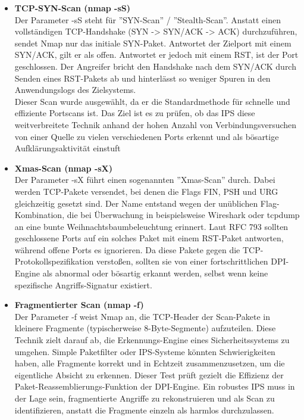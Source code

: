 \begin{itemize}
	\item \textbf{TCP-SYN-Scan (nmap -sS)}\\
	Der Parameter -sS steht für ''SYN-Scan'' / ''Stealth-Scan''. Anstatt einen vollständigen TCP-Handshake (SYN -> SYN/ACK -> ACK) durchzuführen, sendet Nmap nur das initiale SYN-Paket. Antwortet der Zielport mit einem SYN/ACK, gilt er als offen. Antwortet er jedoch mit einem RST, ist der Port geschlossen. Der Angreifer bricht den Handshake nach dem SYN/ACK durch Senden eines RST-Pakets ab und hinterlässt so weniger Spuren in den Anwendungslogs des Zielsystems.\\
	Dieser Scan wurde ausgewählt, da er die Standardmethode für schnelle und effiziente Portscans ist. Das Ziel ist es zu prüfen, ob das IPS diese weitverbreitete Technik anhand der hohen Anzahl von Verbindungsversuchen von einer Quelle zu vielen verschiedenen Ports erkennt und als bösartige Aufklärungsaktivität einstuft\\
	
	\item \textbf{Xmas-Scan (nmap -sX)}\\
	 Der Parameter -sX führt einen sogenannten ''Xmas-Scan'' durch. Dabei werden TCP-Pakete versendet, bei denen die Flags FIN, PSH und URG gleichzeitig gesetzt sind. Der Name entstand wegen der unüblichen Flag-Kombination, die bei Überwachung in beispielsweise Wireshark oder tcpdump an eine bunte Weihnachtsbaumbeleuchtung erinnert. Laut RFC 793 sollten geschlossene Ports auf ein solches Paket mit einem RST-Paket antworten, während offene Ports es ignorieren.\cite{TCP}
	 Da diese Pakete gegen die TCP-Protokollspezifikation verstoßen, sollten sie von einer fortschrittlichen DPI-Engine als abnormal oder bösartig erkannt werden, selbst wenn keine spezifische Angriffs-Signatur existiert.\\

	\item \textbf{Fragmentierter Scan (nmap -f)}\\
	Der Parameter -f weist Nmap an, die TCP-Header der Scan-Pakete in kleinere Fragmente (typischerweise 8-Byte-Segmente) aufzuteilen. Diese Technik zielt darauf ab, die Erkennungs-Engine eines Sicherheitssystems zu umgehen. Simple Paketfilter oder IPS-Systeme könnten Schwierigkeiten haben, alle Fragmente korrekt und in Echtzeit zusammenzusetzen, um die eigentliche Absicht zu erkennen.
	Dieser Test prüft gezielt die Effizienz der Paket-Reassemblierungs-Funktion der DPI-Engine. Ein robustes IPS muss in der Lage sein, fragmentierte Angriffe zu rekonstruieren und als Scan zu identifizieren, anstatt die Fragmente einzeln als harmlos durchzulassen.\\
	

\end{itemize}
